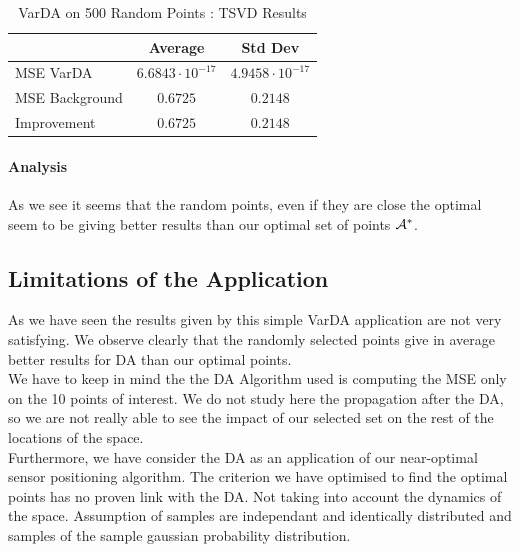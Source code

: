\begin{table}[h]
\centering
\begin{tabular}{l|cc}
\toprule
               & Average & Std Dev \\ \midrule
MSE VarDA      & $6.6843 \cdot 10^{-17}$  & $4.9458 \cdot 10^{-17}$  \\
MSE Background & $0.6725$  & $0.2148$  \\
Improvement    & $0.6725$  & $0.2148$ \\ \bottomrule
\end{tabular}
	\caption{VarDA on 500 Random Points : TSVD Results}
	\label{tab:TSVD:random}
\end{table}
\paragraph{Analysis}

As we see it seems that the random points, even if they are close the optimal seem to be giving better results than our optimal set of points $\mathcal{A}^*$. 



\subsection{Limitations of the Application}

As we have seen the results given by this simple VarDA application are not very satisfying. We observe clearly that the randomly selected points give in average better results for DA than our optimal points. \\

We have to keep in mind the the DA Algorithm used is computing the MSE only on the 10 points of interest. We do not study here the propagation after the DA, so we are not really able to see the impact of our selected set on the rest of the locations of the space. \\
Furthermore, we have consider the DA as an application of our near-optimal sensor positioning algorithm. The criterion we have optimised to find the optimal points has no proven link with the DA. Not taking into account the dynamics of the space. Assumption of samples are independant and identically distributed and samples of the sample gaussian probability distribution. 

